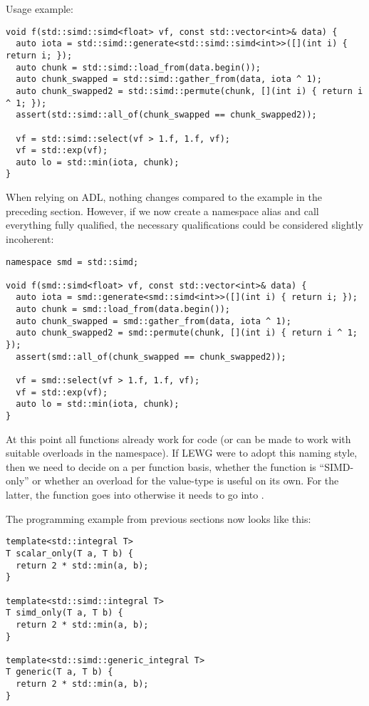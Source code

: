 Usage example:
\medskip\begin{lstlisting}[style=Vc]
void f(std::simd::simd<float> vf, const std::vector<int>& data) {
  auto iota = std::simd::generate<std::simd::simd<int>>([](int i) { return i; });
  auto chunk = std::simd::load_from(data.begin());
  auto chunk_swapped = std::simd::gather_from(data, iota ^ 1);
  auto chunk_swapped2 = std::simd::permute(chunk, [](int i) { return i ^ 1; });
  assert(std::simd::all_of(chunk_swapped == chunk_swapped2));

  vf = std::simd::select(vf > 1.f, 1.f, vf);
  vf = std::exp(vf);
  auto lo = std::min(iota, chunk);
}
\end{lstlisting}

When relying on ADL, nothing changes compared to the example in the preceding
section.
However, if we now create a namespace alias and call everything fully
qualified, the necessary qualifications could be considered slightly
incoherent:

\medskip\begin{lstlisting}[style=Vc]
namespace smd = std::simd;

void f(smd::simd<float> vf, const std::vector<int>& data) {
  auto iota = smd::generate<smd::simd<int>>([](int i) { return i; });
  auto chunk = smd::load_from(data.begin());
  auto chunk_swapped = smd::gather_from(data, iota ^ 1);
  auto chunk_swapped2 = smd::permute(chunk, [](int i) { return i ^ 1; });
  assert(smd::all_of(chunk_swapped == chunk_swapped2));

  vf = smd::select(vf > 1.f, 1.f, vf);
  vf = std::exp(vf);
  auto lo = std::min(iota, chunk);
}
\end{lstlisting}

At this point all functions already work for \simdgeneric code (or can be made
to work with suitable overloads in the \std{} namespace).
If LEWG were to adopt this naming style, then we need to decide on a per
function basis, whether the function is “SIMD-only” or whether an overload for
the value-type is useful on its own.
For the latter, the function goes into  otherwise it needs to go
into \std{}.

The \simdgeneric programming example from previous sections now looks like
this:
\medskip\begin{lstlisting}[style=Vc]
template<std::integral T>
T scalar_only(T a, T b) {
  return 2 * std::min(a, b);
}

template<std::simd::integral T>
T simd_only(T a, T b) {
  return 2 * std::min(a, b);
}

template<std::simd::generic_integral T>
T generic(T a, T b) {
  return 2 * std::min(a, b);
}
\end{lstlisting}

